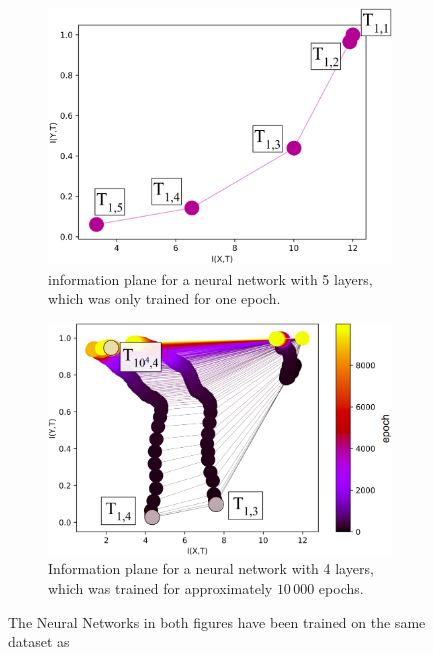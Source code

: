 \documentclass[dissertation.tex]{subfiles}
\begin{document}
\begin{figure}[H]
  \centering
  \begin{subfigure}[t]{0.48\textwidth}
    \centering
    \includegraphics[width=\textwidth]{figs/ip_1v3.png}
    \caption{
      information plane for a neural network with 5 layers, which was only trained
      for one epoch.
    }
    \label{fig:Ip1}
  \end{subfigure}
  \hfill
  \begin{subfigure}[t]{0.5\textwidth}
    \centering
    \includegraphics[width=\textwidth]{figs/ip_10000v3.png}
    \caption{
      Information plane for a neural network with 4 layers, which was trained
      for approximately $10\,000$ epochs.
    }
    \label{fig:Ip2}
  \end{subfigure}
  \caption{
    The Neural Networks in both figures have been trained on the same dataset as
}
\end{figure}
\end{document}
